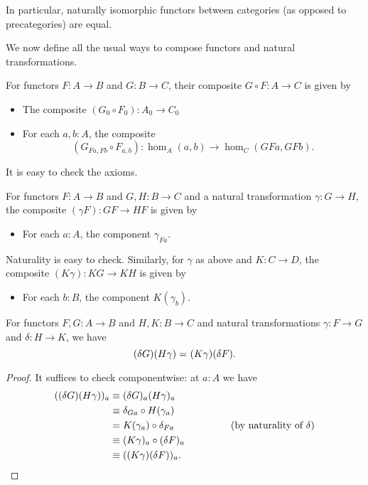 In particular, naturally isomorphic functors between categories (as opposed to precategories) are equal.

\mentalpause

We now define all the usual ways to compose functors and natural transformations.

\begin{defn}
  For functors $F:A\to B$ and $G:B\to C$, their composite $G\circ F:A\to C$ is given by
  \begin{itemize}
  \item The composite $(G_0\circ F_0) : A_0 \to C_0$
  \item For each $a,b:A$, the composite
    \[(G_{Fa,Fb}\circ F_{a,b}):\hom_A(a,b) \to \hom_C(GFa,GFb).\]
  \end{itemize}
  It is easy to check the axioms.
\end{defn}

\begin{defn}
  For functors $F:A\to B$ and $G,H:B\to C$ and a natural transformation $\gamma:G\to H$, the composite $(\gamma F):GF\to HF$ is given by
  \begin{itemize}
  \item For each $a:A$, the component $\gamma_{Fa}$.
  \end{itemize}
  Naturality is easy to check.
  Similarly, for $\gamma$ as above and $K:C\to D$, the composite $(K\gamma):KG\to KH$ is given by
  \begin{itemize}
  \item For each $b:B$, the component $K(\gamma_b)$.
  \end{itemize}
\end{defn}

\begin{lem}\label{ct:interchange}
  For functors $F,G:A\to B$ and $H,K:B\to C$ and natural transformations $\gamma:F\to G$ and $\delta:H\to K$, we have
  \[(\delta G)(H\gamma) =_{} (K\gamma)(\delta F).\]
\end{lem}
\begin{proof}
  It suffices to check componentwise: at $a:A$ we have
  \begin{align*}
    ((\delta G)(H\gamma))_a
    &\equiv (\delta G)_{a}(H\gamma)_a\\
    &\equiv \delta_{Ga}\circ H(\gamma_a)\\
    &= K(\gamma_a) \circ \delta_{Fa} \hspace{2cm}\text{(by naturality of $\delta$)}\\
    &\equiv (K \gamma)_a\circ (\delta F)_a\\
    &\equiv ((K \gamma)(\delta F))_a.\qedhere
  \end{align*}
\end{proof}


